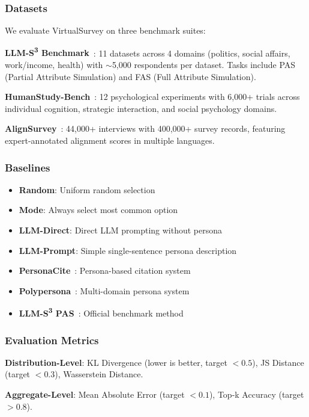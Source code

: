 \documentclass[sigconf,nonarchival]{acmart}
\begin{document}
\subsubsection{Datasets}

We evaluate VirtualSurvey on three benchmark suites:

\textbf{LLM-S\textsuperscript{3} Benchmark}~\cite{llms3}: 11 datasets across 4 domains (politics, social affairs, work/income, health) with $\sim$5,000 respondents per dataset. Tasks include PAS (Partial Attribute Simulation) and FAS (Full Attribute Simulation).

\textbf{HumanStudy-Bench}~\cite{humanstudy}: 12 psychological experiments with 6,000+ trials across individual cognition, strategic interaction, and social psychology domains.

\textbf{AlignSurvey}~\cite{alignsurvey}: 44,000+ interviews with 400,000+ survey records, featuring expert-annotated alignment scores in multiple languages.

\subsubsection{Baselines}

\begin{itemize}
\item \textbf{Random}: Uniform random selection
\item \textbf{Mode}: Always select most common option
\item \textbf{LLM-Direct}: Direct LLM prompting without persona
\item \textbf{LLM-Prompt}: Simple single-sentence persona description
\item \textbf{PersonaCite}~\cite{personacite}: Persona-based citation system
\item \textbf{Polypersona}~\cite{polypersona}: Multi-domain persona system
\item \textbf{LLM-S\textsuperscript{3} PAS}~\cite{llms3}: Official benchmark method
\end{itemize}

\subsubsection{Evaluation Metrics}

\textbf{Distribution-Level}: KL Divergence (lower is better, target $< 0.5$), JS Distance (target $< 0.3$), Wasserstein Distance.

\textbf{Aggregate-Level}: Mean Absolute Error (target $< 0.1$), Top-k Accuracy (target $> 0.8$).
\end{document}

